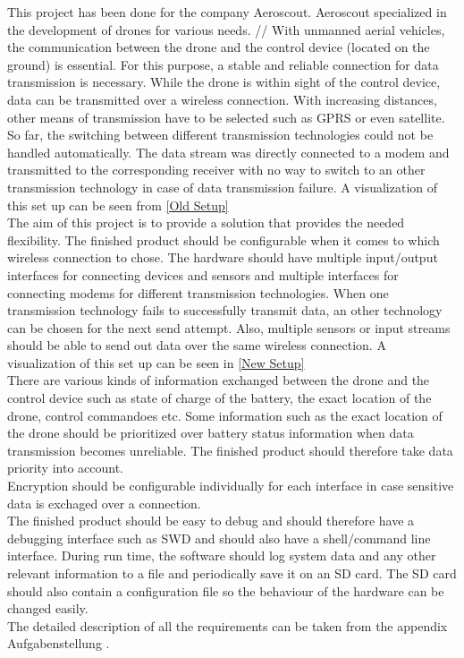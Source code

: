 %
This project has been done for the company Aeroscout. Aeroscout specialized in the development of drones for various needs. //
With unmanned aerial vehicles, the communication between the drone and the control device (located on the ground) is essential. For this purpose, a stable and reliable connection for data transmission is necessary. While the drone is within sight of the control device, data can be transmitted over a wireless connection. With increasing distances, other means of transmission have to be selected such as GPRS or even satellite.\\
%
So far, the switching between different transmission technologies could not be handled automatically. The data stream was directly connected to a modem and transmitted to the corresponding receiver with no way to switch to an other transmission technology in case of data transmission failure. A visualization of this set up can be seen from \autoref{Old Setup}\\
%
The aim of this project is to provide a solution that provides the needed flexibility. The finished product should be configurable when it comes to which wireless connection to chose. The hardware should have multiple input/output interfaces for connecting devices and sensors and multiple interfaces for connecting modems for different transmission technologies. When one transmission technology fails to successfully transmit data, an other technology can be chosen for the next send attempt. Also, multiple sensors or input streams should be able to send out data over the same wireless connection. A visualization of this set up can be seen in \autoref{New Setup}\\
There are various kinds of information exchanged between the drone and the control device such as state of charge of the battery, the exact location of the drone, control commandoes etc. Some information such as the exact location of the drone should be prioritized over battery status information when data transmission becomes unreliable. The finished product should therefore take data priority into account. \\
Encryption should be configurable individually for each interface in case sensitive data is exchaged over a connection. \\
The finished product should be easy to debug and should therefore have a debugging interface such as SWD and should also have a shell/command line interface. During run time, the software should log system data and any other relevant information to a file and periodically save it on an SD card. The SD card should also contain a configuration file so the behaviour of the hardware can be changed easily. \\
The detailed description of all the requirements can be taken from the appendix Aufgabenstellung .